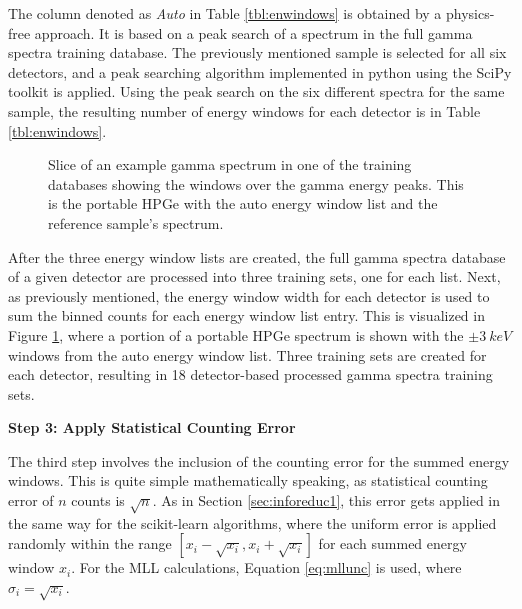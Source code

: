 The column denoted as \textit{Auto} in Table \ref{tbl:enwindows} is obtained by
a physics-free approach. It is based on a peak search of a spectrum in the full
gamma spectra training database. The previously mentioned sample is selected
for all six detectors, and a peak searching algorithm implemented in python
using the SciPy toolkit \cite{scipy} is applied. Using the peak search on the
six different spectra for the same sample, the resulting number of energy
windows for each detector is in Table \ref{tbl:enwindows}.  

\begin{figure}[!htb]
  \caption[Portion of gamma spectrum with windows, which shows summation regions 
           for spectra processing]
          {Slice of an example gamma spectrum in one of the training databases
           showing the windows over the gamma energy peaks. This is the portable
           \acrshort{HPGe} with the auto energy window list and the reference 
           sample's spectrum.}
  \label{fig:enwindows}
\end{figure}

After the three energy window lists are created, the full gamma spectra
database of a given detector are processed into three training sets, one for
each list.  Next, as previously mentioned, the energy window width for each
detector is used to sum the binned counts for each energy window list entry.
This is visualized in Figure \ref{fig:enwindows}, where a portion of a portable
\gls{HPGe} spectrum is shown with the $\pm3\:keV$ windows from the auto energy
window list.  Three training sets are created for each detector, resulting in
18 detector-based processed gamma spectra training sets.

\noindent \textbf{Step 3: Apply Statistical Counting Error}

The third step involves the inclusion of the counting error for the summed
energy windows. This is quite simple mathematically speaking, as statistical
counting error of $n$ counts is $\sqrt{n}$.  As in Section
\ref{sec:inforeduc1}, this error gets applied in the same way for the
scikit-learn algorithms, where the uniform error is applied randomly within the
range $[x_i - \sqrt{x_i}, x_i + \sqrt{x_i}]$ for each summed energy window
$x_i$. For the \gls{MLL} calculations, Equation \ref{eq:mllunc} is used, where
$\sigma_{i} = \sqrt{x_i}$.  

